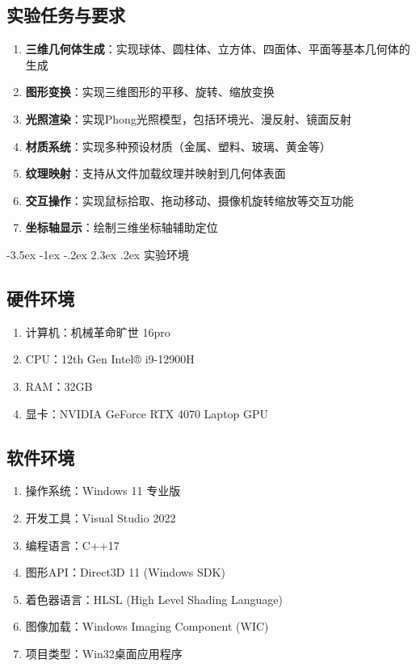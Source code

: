 \documentclass[12pt,a4paper]{article}
\makeatletter
\renewcommand\section{\@startsection{section}{1}{\z@}%
    {-3.5ex \@plus -1ex \@minus -.2ex}%
    {2.3ex \@plus.2ex}%
    {\normalfont\Large\bfseries\songti}}
\makeatother
\begin{document}
\subsection{实验任务与要求}

\begin{tcolorbox}
\begin{enumerate}
    \item \textbf{三维几何体生成}：实现球体、圆柱体、立方体、四面体、平面等基本几何体的生成
    \item \textbf{图形变换}：实现三维图形的平移、旋转、缩放变换
    \item \textbf{光照渲染}：实现Phong光照模型，包括环境光、漫反射、镜面反射
    \item \textbf{材质系统}：实现多种预设材质（金属、塑料、玻璃、黄金等）
    \item \textbf{纹理映射}：支持从文件加载纹理并映射到几何体表面
    \item \textbf{交互操作}：实现鼠标拾取、拖动移动、摄像机旋转缩放等交互功能
    \item \textbf{坐标轴显示}：绘制三维坐标轴辅助定位
\end{enumerate}
\end{tcolorbox}

\clearpage

\section{实验环境}
\begin{tcolorbox}
\subsection{硬件环境}

\begin{enumerate}
    \item 计算机：机械革命旷世 16pro
    \item CPU：12th Gen Intel® i9-12900H
    \item RAM：32GB
    \item 显卡：NVIDIA GeForce RTX 4070 Laptop GPU
\end{enumerate}

\subsection{软件环境}

\begin{enumerate}
    \item 操作系统：Windows 11 专业版
    \item 开发工具：Visual Studio 2022
    \item 编程语言：C++17
    \item 图形API：Direct3D 11 (Windows SDK)
    \item 着色器语言：HLSL (High Level Shading Language)
    \item 图像加载：Windows Imaging Component (WIC)
    \item 项目类型：Win32桌面应用程序
\end{enumerate}
\end{tcolorbox}
\end{document}
